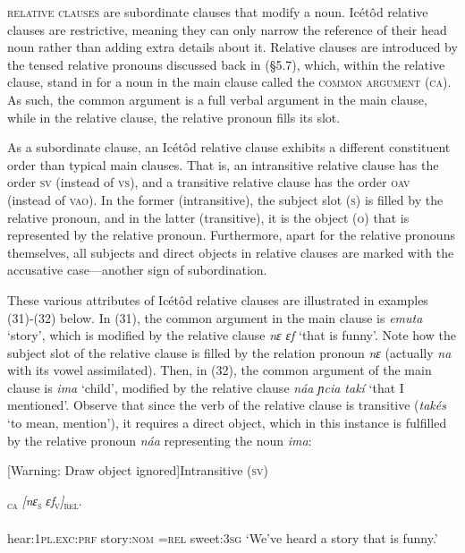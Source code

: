 \textsc{relative clauses} are subordinate clauses that modify a noun. Icétôd relative clauses are restrictive, meaning they can only narrow the reference of their head noun rather than adding extra details about it. Relative clauses are introduced by the tensed relative pronouns discussed back in (§5.7), which, within the relative clause, stand in for a noun in the main clause called the \textsc{common argument} (\textsc{ca}). As such, the common argument is a full verbal argument in the main clause, while in the relative clause, the relative pronoun fills its slot.

As a subordinate clause, an Icétôd relative clause exhibits a different constituent order than typical main clauses. That is, an intransitive relative clause has the order \textsc{sv} (instead of \textsc{vs}), and a transitive relative clause has the order \textsc{oav} (instead of \textsc{vao}). In the former (intransitive), the subject slot (\textsc{s}) is filled by the relative pronoun, and in the latter (transitive), it is the object (\textsc{o}) that is represented by the relative pronoun. Furthermore, apart for the relative pronouns themselves, all subjects and direct objects in relative clauses are marked with the accusative case—another sign of subordination.

These various attributes of Icétôd relative clauses are illustrated in examples (31)-(32) below. In (31), the common argument in the main clause is \textit{emuta} ‘story’, which is modified by the relative clause \textit{nɛ ɛf} ‘that is funny’. Note how the subject slot of the relative clause is filled by the relation pronoun \textit{nɛ} (actually \textit{na} with its vowel assimilated). Then, in (32), the common argument of the main clause is \textit{ima} ‘child’, modified by the relative clause \textit{náa ɲcia takí} ‘that I mentioned’. Observe that since the verb of the relative clause is transitive (\textit{takés} ‘to mean, mention’), it requires a direct object, which in this instance is fulfilled by the relative pronoun \textit{náa} representing the noun \textit{ima}:




[Warning: Draw object ignored]Intransitive (\textsc{sv})

\ea\label{ex:}
\textsc{\textsubscript{ca}}\textit{   [nɛ}\textsc{\textsubscript{s}}\textit{   ɛf}\textsc{\textsubscript{v}}\textit{]}\textsc{\textsubscript{rel}}. \\
    \\
hear:\textsc{1pl.exc:prf}  story:\textsc{nom}   =\textsc{rel}   sweet:\textsc{3sg}
\glt ‘We’ve heard a story that is funny.’ 
\z


